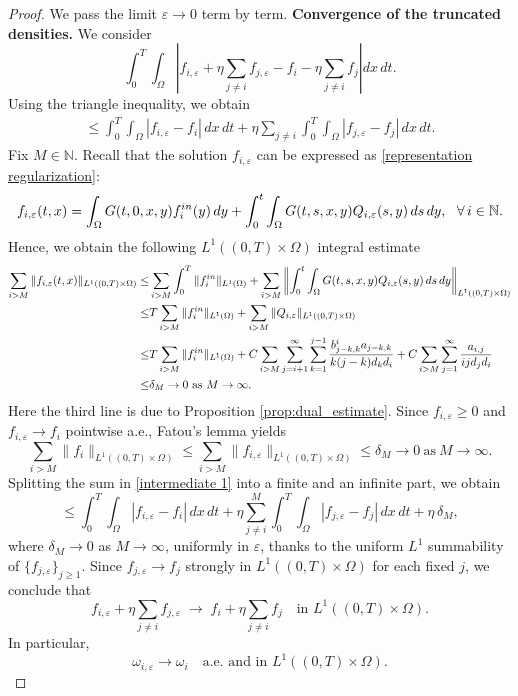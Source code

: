 \documentclass[10pt,a4paper]{amsart}
\begin{document}
	\begin{proof}
		We pass the limit $\varepsilon\to 0$ term by term.
		\newline
		\textbf{Convergence of the truncated densities.}
		We consider
		\[
		\int_{0}^{T}\!\!\int_{\Omega}
		\left|
		f_{i,\varepsilon}
		+ \eta \sum_{j\ne i} f_{j,\varepsilon}
		-
		f_i
		- \eta \sum_{j\ne i} f_j
		\right| dx\,dt .
		\]
		Using the triangle inequality, we obtain
		\begin{align}\label{intermediate 1}
			\le
			\int_{0}^{T}\!\!\int_{\Omega}
			|f_{i,\varepsilon}-f_i|\,dx\,dt
			+
			\eta \sum_{j\ne i}
			\int_{0}^{T}\!\!\int_{\Omega}
			|f_{j,\varepsilon}-f_j|\,dx\,dt .
		\end{align}
		Fix $M\in\mathbb{N}$. Recall that the solution $f_{i,\varepsilon}$ can be expressed as \eqref{representation regularization}:
		\[
		f_{i,\varepsilon}(t,x)= \int_{\Omega}G(t,0,x,y)f_i^{\rm{in}}(y)\, dy+\int_{0}^{t}\int_{\Omega} G(t,s,x,y)Q_{i,\varepsilon}(s,y) \, ds\, dy, \ \ \forall \, i\in\mathbb{N}.
		\]
		Hence, we obtain the following $L^1((0,T)\times\Omega)$ integral estimate
		\begin{align*}
			\sum_{i>M} \|f_{i,\varepsilon}(t,x)\|_{L^1((0,T)\times\Omega)} \leq &\sum_{i>M} \int_0^T\| f_i^{\rm{in}}\|_{L^1(\Omega)}+ \sum_{i>M} \left\| \int_{0}^{t}\int_{\Omega} G(t,s,x,y)Q_{i,\varepsilon}(s,y) \, ds\, dy\right\|_{L^1((0,T)\times\Omega)}\\
			\leq &T\sum_{i>M} \| f_i^{\rm{in}}\|_{L^1(\Omega)}+\sum_{i>M} \| Q_{i,\varepsilon}\|_{L^1((0,T)\times\Omega)} \\\leq & T\sum_{i>M} \| f_i^{\rm{in}}\|_{L^1(\Omega)}+C\sum_{i>M}
			\sum_{j=i+1}^{\infty} \sum_{k=1}^{j-1}
			\frac{b_{j-k,k}^i a_{j-k,k}}{k(j-k)d_{k}d_i}+C\sum_{i>M}
			\sum_{j=1}^{\infty}
			\frac{a_{i,j}}{ijd_jd_i} \\
			\leq & \delta_M\to 0 \ \mbox{as}\ M\to \infty.
		\end{align*}
		Here the third line is due to Proposition \ref{prop:dual_estimate}. Since $f_{i,\varepsilon}\ge0$ and $f_{i,\varepsilon}\to f_i$ pointwise a.e.,
		Fatou's lemma yields
		\[
		\sum_{i>M} \|f_{i}\|_{L^1((0,T)\times\Omega)} \leq \sum_{i>M} \|f_{i,\varepsilon}\|_{L^1((0,T)\times\Omega)}\leq \delta_M\to 0 \ \mbox{as}\ M\to \infty.
		\]
		Splitting the sum in \eqref{intermediate 1} into a finite and an infinite part,
		we obtain
		\[
		\le
		\int_{0}^{T}\!\!\int_{\Omega}
		|f_{i,\varepsilon}-f_i|\,dx\,dt
		+
		\eta \sum_{j\ne i}^{M}
		\int_{0}^{T}\!\!\int_{\Omega}
		|f_{j,\varepsilon}-f_j|\,dx\,dt
		+
		\eta\,\delta_M,
		\]
		where $\delta_M\to0$ as $M\to\infty$, uniformly in $\varepsilon$, thanks to
		the uniform $L^1$ summability of $\{f_{j,\varepsilon}\}_{j\ge1}$.
		Since $f_{j,\varepsilon}\to f_j$ strongly in $L^1((0,T)\times\Omega)$ for
		each fixed $j$, we conclude that
		\[
		f_{i,\varepsilon}
		+ \eta \sum_{j\ne i} f_{j,\varepsilon}
		\;\longrightarrow\;
		f_i + \eta \sum_{j\ne i} f_j
		\quad \text{in } L^1((0,T)\times\Omega).
		\]
		In particular,
		\[
		\omega_{i,\varepsilon}
		\longrightarrow
		\omega_i
		\quad \text{a.e. and in } L^1((0,T)\times\Omega).
		\]
		

\end{proof}
\end{document}
